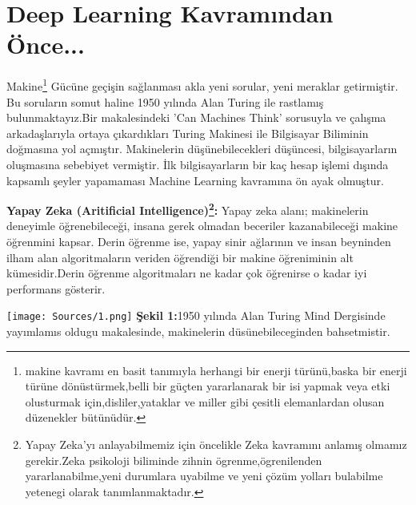 \documentclass{IEEEtran}
\begin{document}
    
    \section{Deep Learning Kavramından Önce...}
        \label{sec:yapayzekatarihce}
            Makine\footnote{makine kavramı en basit tanımıyla herhangi bir enerji türünü,baska bir enerji türüne dönüstürmek,belli bir güçten yararlanarak bir isi yapmak veya etki olusturmak için,disliler,yataklar ve miller gibi çesitli elemanlardan olusan düzenekler bütünüdür.} Gücüne geçişin sağlanması akla yeni sorular, yeni meraklar getirmiştir. Bu soruların somut haline 1950 yılında Alan Turing ile rastlamış bulunmaktayız.Bir makalesindeki 'Can Machines Think' sorusuyla ve çalışma arkadaşlarıyla ortaya çıkardıkları Turing Makinesi ile Bilgisayar Biliminin doğmasına yol açmıştır. 
            Makinelerin düşünebilecekleri düşüncesi, bilgisayarların oluşmasına sebebiyet vermiştir. İlk bilgisayarların bir kaç hesap işlemi dışında kapsamlı şeyler yapamaması Machine Learning kavramına ön ayak olmuştur.\vspace{10pt}
            
            \textbf{Yapay Zeka (Aritificial Intelligence)\footnote{Yapay Zeka'yı anlayabilmemiz için öncelikle Zeka kavramını anlamış olmamız gerekir.Zeka psikoloji biliminde zihnin ögrenme,ögrenilenden yararlanabilme,yeni durumlara uyabilme ve yeni çözüm yolları bulabilme yetenegi olarak tanımlanmaktadır.}:} Yapay zeka alanı; makinelerin deneyimle öğrenebileceği, insana gerek olmadan beceriler kazanabileceği makine öğrenmini kapsar.  Derin öğrenme ise, yapay sinir ağlarının ve insan beyninden ilham alan algoritmaların veriden öğrendiği bir makine öğreniminin alt kümesidir.Derin öğrenme algoritmaları ne kadar çok öğrenirse o kadar iyi performans gösterir.

                \texttt{[image: Sources/1.png]}
                \newline
                \textbf{Şekil 1:}1950 yılında Alan Turing Mind Dergisinde yayımlamıs oldugu makalesinde, makinelerin düsünebileceginden bahsetmistir.\cite{AlanTuringMind}
                \vspace{10pt}

\end{document}
